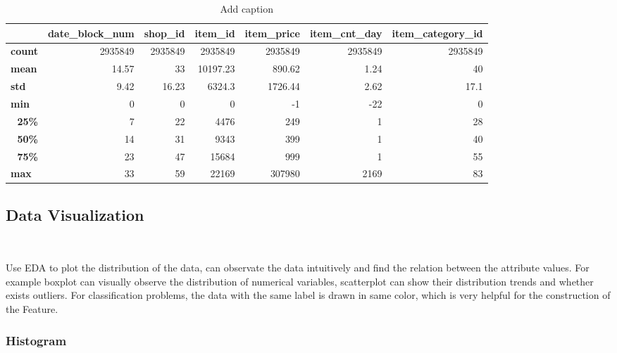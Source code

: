 \begin{table}[htbp]
	\centering
	\caption{Add caption}
	\begin{tabular}{p{2.125em}rrrrrr}
		\toprule
		\multicolumn{1}{c}{} & 
		\multicolumn{1}{p{4em}}{\textbf{date\_block\_num}} & 
		\multicolumn{1}{p{4em}}{\textbf{shop\_id}} & 
		\multicolumn{1}{p{4em}}{\textbf{item\_id}} & 
		\multicolumn{1}{p{4em}}{\textbf{item\_price}} & 
		\multicolumn{1}{p{4em}}{\textbf{item\_cnt\_day}} & 
		\multicolumn{1}{p{4em}}{\textbf{item\_category\_id}} \\
		\midrule
		\textbf{count} & 2935849 & 2935849 & 2935849 & 2935849 & 2935849 & 
		2935849 \\
		\textbf{mean} & 14.57 & 33    & 10197.23 & 890.62 & 1.24  & 40 \\
		\textbf{std} & 9.42  & 16.23 & 6324.3 & 1726.44 & 2.62  & 17.1 \\
		\textbf{min} & 0     & 0     & 0     & -1    & -22   & 0 \\
		\multicolumn{1}{r}{\textbf{25\%}} & 7     & 22    & 4476  & 249   & 
		1     & 28 \\
		\multicolumn{1}{r}{\textbf{50\%}} & 14    & 31    & 9343  & 399   & 
		1     & 40 \\
		\multicolumn{1}{r}{\textbf{75\%}} & 23    & 47    & 15684 & 999   & 
		1     & 55 \\
		\textbf{max} & 33    & 59    & 22169 & 307980 & 2169  & 83 \\
		\bottomrule
	\end{tabular}%
	\label{tbl:data information}%
\end{table}%





\subsection{Data Visualization}
\

Use EDA to plot the distribution of the data,
can observate the data intuitively and
find the relation between the attribute values. 
For example boxplot can visually observe 
the distribution of numerical variables, 
scatterplot can show their distribution trends 
and whether exists outliers.
For classification problems, 
the data with the same label is drawn in same color, 
which is very helpful for 
the construction of the Feature.


\subsubsection{ Histogram}
\

